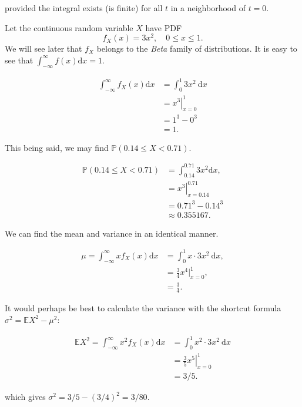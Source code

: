 \documentclass[]{book}
\numberwithin{equation}{chapter}
\numberwithin{figure}{chapter}
\theoremstyle{plain}
\theoremstyle{definition}
\theoremstyle{remark}
\theoremstyle{definition}
\theoremstyle{definition}
\theoremstyle{remark}
\let\BeginKnitrBlock\begin \let\EndKnitrBlock\end
\begin{document}
provided the integral exists (is finite) for all \(t\) in a neighborhood
of \(t=0\).

\bigskip

\BeginKnitrBlock{example}
\protect\hypertarget{ex:cont-pdf3x2}{}{\label{ex:cont-pdf3x2}}Let the
continuous random variable \(X\) have PDF
\[ f_{X}(x)=3x^{2},\quad 0\leq x\leq 1. \] We will see later that
\(f_{X}\) belongs to the \emph{Beta} family of distributions. It is easy
to see that \(\int_{-\infty}^{\infty}f(x)\mathrm{d} x=1\).

\begin{align*}
\int_{-\infty}^{\infty}f_{X}(x)\mathrm{d} x & =\int_{0}^{1}3x^{2}\:\mathrm{d} x\\
 & =\left.x^{3}\right|_{x=0}^{1}\\
 & =1^{3}-0^{3}\\
 & =1.
\end{align*}

This being said, we may find \(\mathbb{P}(0.14\leq X<0.71)\).

\begin{align*}
\mathbb{P}(0.14\leq X<0.71) & =\int_{0.14}^{0.71}3x^{2}\mathrm{d} x,\\
 & =\left.x^{3}\right|_{x=0.14}^{0.71}\\
 & =0.71^{3}-0.14^{3}\\
 & \approx0.355167.
\end{align*}

We can find the mean and variance in an identical manner.

\begin{align*}
\mu=\int_{-\infty}^{\infty}xf_{X}(x)\mathrm{d} x & =\int_{0}^{1}x\cdot3x^{2}\:\mathrm{d} x,\\
 & =\frac{3}{4}x^{4}|_{x=0}^{1},\\
 & =\frac{3}{4}.
\end{align*}

It would perhaps be best to calculate the variance with the shortcut
formula \(\sigma^{2}=\mathbb{E} X^{2}-\mu^{2}\):

\begin{align*}
\mathbb{E} X^{2}=\int_{-\infty}^{\infty}x^{2}f_{X}(x)\mathrm{d} x & =\int_{0}^{1}x^{2}\cdot3x^{2}\:\mathrm{d} x\\
 & =\left.\frac{3}{5}x^{5}\right|_{x=0}^{1}\\
 & =3/5.
\end{align*}

which gives \(\sigma^{2}=3/5-(3/4)^{2}=3/80\).
\EndKnitrBlock{example}
\end{document}
